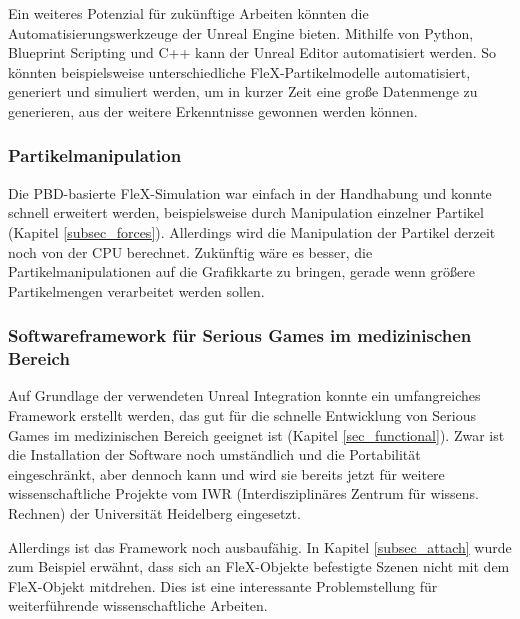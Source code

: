 Ein weiteres Potenzial für zukünftige Arbeiten könnten die Automatisierungswerkzeuge der Unreal Engine bieten. Mithilfe von Python, Blueprint Scripting und C++ kann der Unreal Editor automatisiert werden. So könnten beispielsweise unterschiedliche FleX-Partikelmodelle automatisiert, generiert und simuliert werden, um in kurzer Zeit eine große Datenmenge zu generieren, aus der weitere Erkenntnisse gewonnen werden können.

\subsubsection{Partikelmanipulation}
Die PBD-basierte FleX-Simulation war einfach in der Handhabung und konnte schnell erweitert werden, beispielsweise durch Manipulation einzelner Partikel (Kapitel \ref{subsec_forces}). Allerdings wird die Manipulation der Partikel derzeit noch von der CPU berechnet. Zukünftig wäre es besser, die Partikelmanipulationen auf die Grafikkarte zu bringen, gerade wenn größere Partikelmengen verarbeitet werden sollen. 

\subsubsection{Softwareframework für Serious Games im medizinischen Bereich}
Auf Grundlage der verwendeten Unreal Integration konnte ein umfangreiches Framework erstellt  werden, das gut für die schnelle Entwicklung von Serious Games im medizinischen Bereich geeignet ist (Kapitel \ref{sec_functional}). 
Zwar ist die Installation der Software noch umständlich  und die Portabilität eingeschränkt, aber dennoch kann und wird sie bereits jetzt für weitere wissenschaftliche Projekte vom IWR (Interdisziplinäres Zentrum für wissens. Rechnen) der Universität Heidelberg eingesetzt. 

Allerdings ist das Framework noch ausbaufähig. In Kapitel \ref{subsec_attach} wurde zum Beispiel erwähnt, dass sich an FleX-Objekte befestigte Szenen nicht mit dem FleX-Objekt mitdrehen. Dies ist eine interessante Problemstellung für weiterführende wissenschaftliche Arbeiten.

